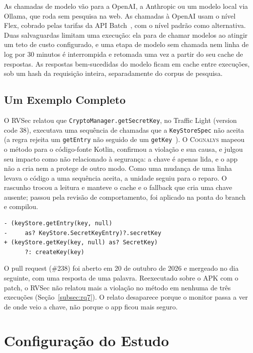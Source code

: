 \documentclass[conference]{IEEEtran}
\newcommand{\system}{\textsc{Cognalys}}
\begin{document}
As chamadas de modelo vão para a OpenAI, a Anthropic ou um modelo local via
Ollama, que roda sem pesquisa na web. As chamadas à OpenAI usam o nível Flex,
cobrado pelas tarifas da API Batch~\cite{openai2026flex}, com o nível padrão
como alternativa. Duas salvaguardas limitam uma execução: ela para de chamar
modelos ao atingir um teto de custo configurado, e uma etapa de modelo sem
chamada nem linha de log por 30 minutos é interrompida e retomada uma vez a
partir do seu cache de respostas. As respostas bem-sucedidas do modelo ficam em
cache entre execuções, sob um hash da requisição inteira, separadamente do
corpus de pesquisa.

\subsection{Um Exemplo Completo}

O RVSec relatou que \texttt{CryptoManager.getSecretKey}, no Traffic Light
(version code 38), executava uma sequência de chamadas que a
\texttt{KeyStoreSpec} não aceita (a regra rejeita um \texttt{getEntry} não seguido de
um \texttt{getKey}~\cite{costa2026effectiveness}). O \system{} mapeou o método para
o código-fonte Kotlin, confirmou a violação e sua causa, e julgou seu impacto
como não relacionado à segurança: a chave é apenas lida, e o app não a cria nem
a protege de outro modo. Como uma mudança de uma linha levava o código a uma
sequência aceita, a unidade seguiu para o reparo. O rascunho trocou a leitura e
manteve o cache e o fallback que cria uma chave ausente; passou pela revisão de
comportamento, foi aplicado na ponta do branch e compilou.

{\scriptsize
\begin{verbatim}
- (keyStore.getEntry(key, null)
-     as? KeyStore.SecretKeyEntry)?.secretKey
+ (keyStore.getKey(key, null) as? SecretKey)
      ?: createKey(key)
\end{verbatim}}

O pull request (\#238) foi aberto em 20 de outubro de 2026 e
mergeado no dia seguinte, com uma resposta de uma palavra. Reexecutado sobre o
APK com o patch, o RVSec não relatou mais a violação no método em nenhuma de
três execuções (Seção~\ref{subsec:rq7}). O relato desaparece porque o monitor
passa a ver de onde veio a chave, não porque o app ficou mais seguro.

\section{Configuração do Estudo}
\label{sec:settings}
\end{document}
